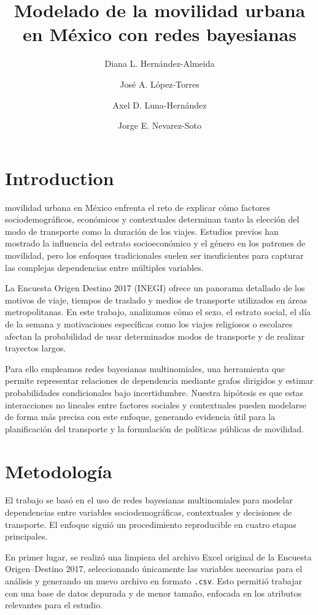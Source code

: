 \documentclass[eng]{ajceam-class}
\title{Modelado de la movilidad urbana en México con redes bayesianas}
\author[1]{Diana L. Hernández-Almeida}
\author[1]{José A. López-Torres}
\author[1]{Axel D. Luna-Hernández}
\author[1]{Jorge E. Nevarez-Soto}
\affil[1]{Tecnologico de Monterrey}
\begin{document}
\maketitle
\thispagestyle{fancy}



\section{Introduction}
movilidad urbana en México enfrenta el reto de explicar cómo factores sociodemográficos, económicos y contextuales determinan tanto la elección del modo de transporte como la duración de los viajes. Estudios previos han mostrado la influencia del estrato socioeconómico y el género en los patrones de movilidad, pero los enfoques tradicionales suelen ser insuficientes para capturar las complejas dependencias entre múltiples variables.

La Encuesta Origen Destino 2017 (INEGI) ofrece un panorama detallado de los motivos de viaje, tiempos de traslado y medios de transporte utilizados en áreas metropolitanas. En este trabajo, analizamos cómo el sexo, el estrato social, el día de la semana y motivaciones específicas como los viajes religiosos o escolares afectan la probabilidad de usar determinados modos de transporte y de realizar trayectos largos.

Para ello empleamos redes bayesianas multinomiales, una herramienta que permite representar relaciones de dependencia mediante grafos dirigidos y estimar probabilidades condicionales bajo incertidumbre. Nuestra hipótesis es que estas interacciones no lineales entre factores sociales y contextuales pueden modelarse de forma más precisa con este enfoque, generando evidencia útil para la planificación del transporte y la formulación de políticas públicas de movilidad.

\section{Metodología}

El trabajo se basó en el uso de redes bayesianas multinomiales para modelar dependencias entre variables sociodemográficas, contextuales y decisiones de transporte. El enfoque siguió un procedimiento reproducible en cuatro etapas principales.

En primer lugar, se realizó una limpieza del archivo Excel original de la Encuesta Origen--Destino 2017, seleccionando únicamente las variables necesarias para el análisis y generando un nuevo archivo en formato \texttt{.csv}. Esto permitió trabajar con una base de datos depurada y de menor tamaño, enfocada en los atributos relevantes para el estudio.
\end{document}
